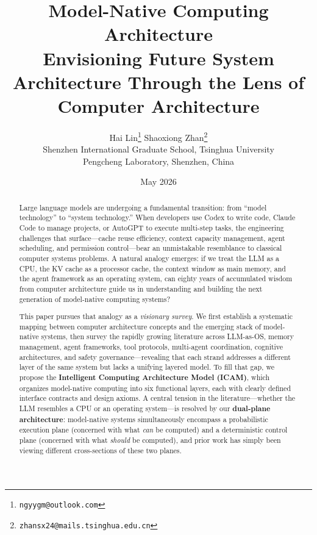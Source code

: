 \documentclass[11pt,a4paper]{article}
\title{\textbf{Model-Native Computing Architecture}\\[6pt]
\large Envisioning Future System Architecture Through the Lens of Computer Architecture}
\author{Hai Lin\thanks{\texttt{ngyygm@outlook.com}} \quad Shaoxiong Zhan\thanks{\texttt{zhansx24@mails.tsinghua.edu.cn}}\\[4pt]
\small Shenzhen International Graduate School, Tsinghua University\\
Pengcheng Laboratory, Shenzhen, China}
\date{May 2026}
\newcounter{axiom}[section]
\begin{document}
\maketitle

\begin{abstract}
Large language models are undergoing a fundamental transition: from ``model technology'' to ``system technology.''
When developers use Codex to write code, Claude Code to manage projects, or AutoGPT to execute multi-step tasks, the engineering challenges that surface---cache reuse efficiency, context capacity management, agent scheduling, and permission control---bear an unmistakable resemblance to classical computer systems problems.
A natural analogy emerges: if we treat the LLM as a CPU, the KV cache as a processor cache, the context window as main memory, and the agent framework as an operating system, can eighty years of accumulated wisdom from computer architecture guide us in understanding and building the next generation of model-native computing systems?

This paper pursues that analogy as a \emph{visionary survey}.
We first establish a systematic mapping between computer architecture concepts and the emerging stack of model-native systems, then survey the rapidly growing literature across LLM-as-OS, memory management, agent frameworks, tool protocols, multi-agent coordination, cognitive architectures, and safety governance---revealing that each strand addresses a different layer of the same system but lacks a unifying layered model.
To fill that gap, we propose the \textbf{Intelligent Computing Architecture Model (ICAM)}, which organizes model-native computing into six functional layers, each with clearly defined interface contracts and design axioms.
A central tension in the literature---whether the LLM resembles a CPU or an operating system---is resolved by our \textbf{dual-plane architecture}: model-native systems simultaneously encompass a probabilistic execution plane (concerned with what \emph{can} be computed) and a deterministic control plane (concerned with what \emph{should} be computed), and prior work has simply been viewing different cross-sections of these two planes.


\end{abstract}
\end{document}
